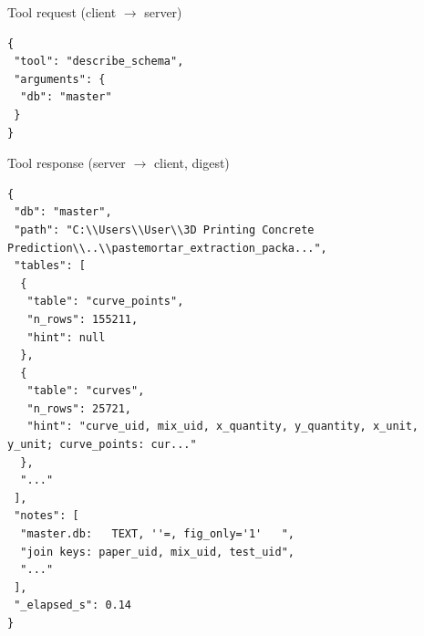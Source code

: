 \begin{mcpbox}{Tool request (client $\rightarrow$ server)}
\begin{lstlisting}[style=jsonstyle]
{
 "tool": "describe_schema",
 "arguments": {
  "db": "master"
 }
}
\end{lstlisting}
\end{mcpbox}
\begin{mcpbox}{Tool response (server $\rightarrow$ client, digest)}
\begin{lstlisting}[style=jsonstyle]
{
 "db": "master",
 "path": "C:\\Users\\User\\3D Printing Concrete Prediction\\..\\pastemortar_extraction_packa...",
 "tables": [
  {
   "table": "curve_points",
   "n_rows": 155211,
   "hint": null
  },
  {
   "table": "curves",
   "n_rows": 25721,
   "hint": "curve_uid, mix_uid, x_quantity, y_quantity, x_unit, y_unit; curve_points: cur..."
  },
  "..."
 ],
 "notes": [
  "master.db:   TEXT, ''=, fig_only='1'   ",
  "join keys: paper_uid, mix_uid, test_uid",
  "..."
 ],
 "_elapsed_s": 0.14
}
\end{lstlisting}
\end{mcpbox}